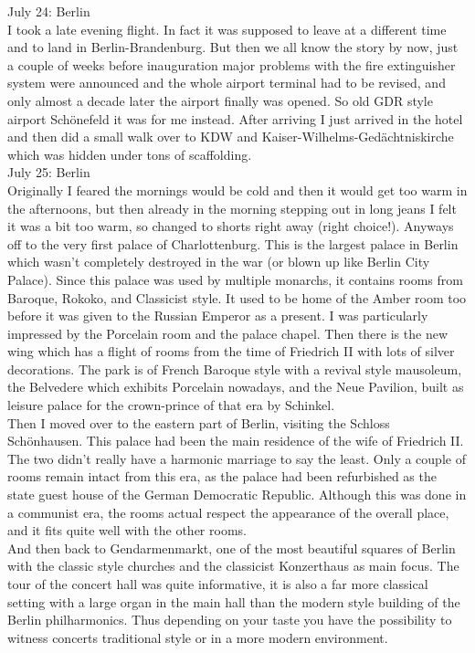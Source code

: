 July 24: Berlin\\
I took a late evening flight. In fact it was supposed to leave at a different time and to land in Berlin-Brandenburg. But then we all know the story by now, just a couple of weeks before inauguration major problems with the fire extinguisher system were announced and the whole airport terminal had to be revised, and only almost a decade later the airport finally was opened. So old GDR style airport Sch\"onefeld it was for me instead. After arriving I just arrived in the hotel and then did a small walk over to KDW and Kaiser-Wilhelms-Ged\"achtniskirche which was hidden under tons of scaffolding.\\

July 25: Berlin\\
Originally I feared the mornings would be cold and then it would get too warm in the afternoons, but then already in the morning stepping out in long jeans I felt it was a bit too warm, so changed to shorts right away (right choice!). Anyways off to the very first palace of Charlottenburg. This is the largest palace in Berlin which wasn't completely destroyed in the war (or blown up like Berlin City Palace). Since this palace was used by multiple monarchs, it contains rooms from Baroque, Rokoko, and Classicist style. It used to be home of the Amber room too before it was given to the Russian Emperor as a present. I was particularly impressed by the Porcelain room and the palace chapel. Then there is the new wing which has a flight of rooms from the time of Friedrich II with lots of silver decorations. The park is of French Baroque style with a revival style mausoleum, the Belvedere which exhibits Porcelain nowadays, and the Neue Pavilion, built as leisure palace for the crown-prince of that era by Schinkel.\\
Then I moved over to the eastern part of Berlin, visiting the Schloss Sch\"onhausen. This palace had been the main residence of the wife of Friedrich II. The two didn't really have a harmonic marriage to say the least. Only a couple of rooms remain intact from this era, as the palace had been refurbished as the state guest house of the German Democratic Republic. Although this was done in a communist era, the rooms actual respect the appearance of the overall place, and it fits quite well with the other rooms.\\
And then back to Gendarmenmarkt, one of the most beautiful squares of Berlin with the classic style churches and the classicist Konzerthaus as main focus. The tour of the concert hall was quite informative, it is also a far more classical setting with a large organ in the main hall than the modern style building of the Berlin philharmonics. Thus depending on your taste you have the possibility to witness concerts traditional style or in a more modern environment. \\
